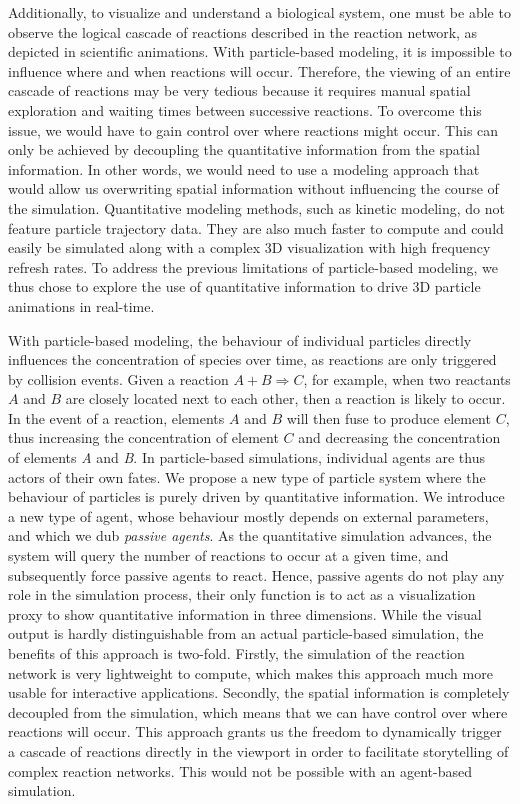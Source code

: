 Additionally, to visualize and understand a biological system, one must be able to observe the logical cascade of reactions described in the reaction network, as depicted in scientific animations.
With particle-based modeling, it is impossible to influence where and when reactions will occur.
Therefore, the viewing of an entire cascade of reactions may be very tedious because it requires manual spatial exploration and waiting times between successive reactions.
To overcome this issue, we would have to gain control over where reactions might occur.
This can only be achieved by decoupling the quantitative information from the spatial information.
In other words, we would need to use a modeling approach that would allow us overwriting spatial information without influencing the course of the simulation.
Quantitative modeling methods, such as kinetic modeling, do not feature particle trajectory data.
They are also much faster to compute and could easily be simulated along with a complex 3D visualization with high frequency refresh rates.
To address the previous limitations of particle-based modeling, we thus chose to explore the use of quantitative information to drive 3D particle animations in real-time.

With particle-based modeling, the behaviour of individual particles directly influences the concentration of species over time, as reactions are only triggered by collision events.
Given a reaction $A + B \Rightarrow C$, for example, when two reactants $A$ and $B$ are closely located next to each other, then a reaction is likely to occur.
In the event of a reaction, elements $A$ and $B$ will then fuse to produce element $C$, thus increasing the concentration of element $C$ and decreasing the concentration of elements \textit{A} and \textit{B}.
In particle-based simulations, individual agents are thus actors of their own fates.
We propose a new type of particle system where the behaviour of particles is purely driven by quantitative information.
We introduce a new type of agent, whose behaviour mostly depends on external parameters, and which we dub \emph{passive agents}.
As the quantitative simulation advances, the system will query the number of reactions to occur at a given time, and subsequently force passive agents to react.
Hence, passive agents do not play any role in the simulation process, their only function is to act as a visualization proxy to show quantitative information in three dimensions.
While the visual output is hardly distinguishable from an actual particle-based simulation, the benefits of this approach is two-fold.
Firstly, the simulation of the reaction network is very lightweight to compute, which makes this approach much more usable for interactive applications.
Secondly, the spatial information is completely decoupled from the simulation, which means that we can have control over where reactions will occur.
This approach grants us the freedom to dynamically trigger a cascade of reactions directly in the viewport in order to facilitate storytelling of complex reaction networks.
This would not be possible with an agent-based simulation.

